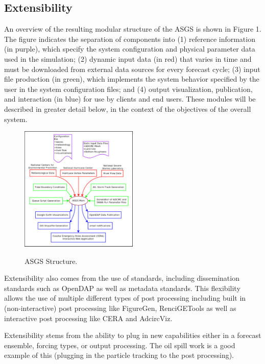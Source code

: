 \documentclass[jmse,article,submit,moreauthors,pdftex,12pt,a4paper]{mdpi}
\begin{document}
\subsection{Extensibility}

An overview of the resulting modular structure of the ASGS is shown 
in Figure 1. The figure indicates the separation of components into 
(1) reference information (in purple), which specify the system 
configuration and physical parameter data used in the simulation; 
(2) dynamic input data (in red) that varies in time and must be 
downloaded from external data sources for every forecast cycle; (3) 
input file production (in green), which implements the system 
behavior specified by the user in the system configuration files; 
and (4) output visualization, publication, and interaction (in blue) 
for use by clients and end users. These modules will be described in 
greater detail below, in the context of the objectives of the 
overall system. 

\begin{figure}[t]
  \centering
  \includegraphics[width=0.5\textwidth]{asgs_structure_color}\\
  \caption{ASGS Structure.}
  \label{fig:asgs_structure}
\end{figure}


Extensibility also comes from the use of standards, including 
dissemination standards such as OpenDAP as well as metadata 
standards. This flexibility allows the use of multiple different 
types of post processing including built in (non-interactive) post 
processing like FigureGen, RenciGETools as well as interactive post 
processing like CERA and AdcircViz.

Extensibility stems from the ability to plug in new capabilities
either in a forecast ensemble, forcing types, or output processing.
The oil spill work is a good example of this (plugging in the 
particle tracking to the post processing). 
\end{document}
